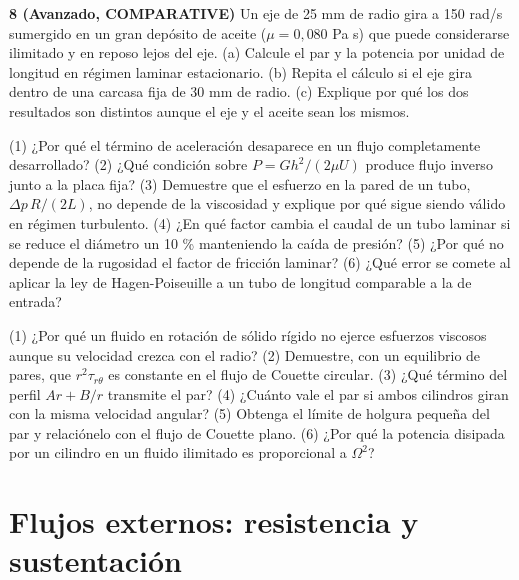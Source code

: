 \documentclass[10pt,openany]{book}
\begin{document}
\begin{tcolorbox}[title={Ejercicios propuestos}, studiumworked, breakable]
\noindent\textbf{8 (Avanzado, COMPARATIVE)}
Un eje de 25 mm de radio gira a 150 rad/s sumergido en un gran depósito de aceite (\(\mu = 0{,}080\) Pa s) que puede considerarse ilimitado y en reposo lejos del eje. (a) Calcule el par y la potencia por unidad de longitud en régimen laminar estacionario. (b) Repita el cálculo si el eje gira dentro de una carcasa fija de 30 mm de radio. (c) Explique por qué los dos resultados son distintos aunque el eje y el aceite sean los mismos.
\end{tcolorbox}

\begin{tcolorbox}[title={Autoevaluación}, studiumcheck, breakable]

(1) ¿Por qué el término de aceleración desaparece en un flujo completamente desarrollado? (2) ¿Qué condición sobre \(P = Gh^{2}/(2\mu U)\) produce flujo inverso junto a la placa fija? (3) Demuestre que el esfuerzo en la pared de un tubo, \(\Delta p\,R/(2L)\), no depende de la viscosidad y explique por qué sigue siendo válido en régimen turbulento. (4) ¿En qué factor cambia el caudal de un tubo laminar si se reduce el diámetro un 10 \% manteniendo la caída de presión? (5) ¿Por qué no depende de la rugosidad el factor de fricción laminar? (6) ¿Qué error se comete al aplicar la ley de Hagen-Poiseuille a un tubo de longitud comparable a la de entrada?

(1) ¿Por qué un fluido en rotación de sólido rígido no ejerce esfuerzos viscosos aunque su velocidad crezca con el radio? (2) Demuestre, con un equilibrio de pares, que \(r^{2}\tau_{r\theta}\) es constante en el flujo de Couette circular. (3) ¿Qué término del perfil \(A r + B/r\) transmite el par? (4) ¿Cuánto vale el par si ambos cilindros giran con la misma velocidad angular? (5) Obtenga el límite de holgura pequeña del par y relaciónelo con el flujo de Couette plano. (6) ¿Por qué la potencia disipada por un cilindro en un fluido ilimitado es proporcional a \(\Omega^{2}\)?
\end{tcolorbox}
\studiumchaptercheck

\chapter{Flujos externos: resistencia y sustentación}
\label{chap:c07}

\end{document}
